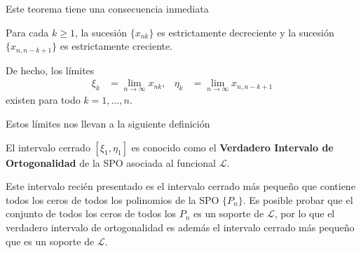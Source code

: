 Este teorema tiene una consecuencia inmediata

\begin{corolario}
    \label{cor:sucesiones-ceros}
    Para cada $k\geq 1$, la sucesión $\{x_{nk}\}$ es estrictamente decreciente y la sucesión $\{x_{n,n-k+1}\}$ es estrictamente creciente. 

    De hecho, los límites
    \begin{align*}
        \xi_k &= \lim_{n\rightarrow\infty} x_{nk}, &  \eta_k &= \lim_{n\rightarrow\infty} x_{n,n-k+1}
    \end{align*}
    existen para todo $k=1,\dots,n$.
\end{corolario}

Estos límites nos llevan a la siguiente definición

\begin{definicion}
    El intervalo cerrado $[\xi_1,\eta_1]$ es conocido como el \textbf{Verdadero Intervalo de Ortogonalidad} de la SPO asociada al funcional $\mathcal{L}$.
\end{definicion}

Este intervalo recién presentado es el intervalo cerrado más pequeño que contiene todos los ceros de todos los polinomios de la SPO $\{P_n\}$. Es posible probar que el conjunto de todos los ceros de todos los $P_n$ es un soporte de $\mathcal{L}$, por lo que el verdadero intervalo de ortogonalidad es además el intervalo cerrado más pequeño que es un soporte de $\mathcal{L}$.


